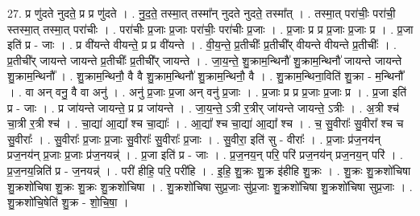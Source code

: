 \documentclass[17pt]{extarticle}
\begin{document}
27. प्र णु॑दते नुदते॒ प्र प्र णु॑दते । . नु॒द॒ते॒ तस्मा॒त् तस्मा᳚न् नुदते नुदते॒ तस्मा᳚त् । . तस्मा॒त् परा॑चीः॒ परा॑ची॒ स्तस्मा॒त् तस्मा॒त् परा॑चीः । . परा॑चीः प्र॒जाः प्र॒जाः परा॑चीः॒ परा॑चीः प्र॒जाः । . प्र॒जाः प्र प्र प्र॒जाः प्र॒जाः प्र । . प्र॒जा इति॑ प्र - जाः । . प्र वी॑यन्ते वीयन्ते॒ प्र प्र वी॑यन्ते । . वी॒य॒न्ते॒ प्र॒तीचीः᳚ प्र॒तीची᳚र् वीयन्ते वीयन्ते प्र॒तीचीः᳚ । . प्र॒तीची᳚र् जायन्ते जायन्ते प्र॒तीचीः᳚ प्र॒तीची᳚र् जायन्ते । . जा॒य॒न्ते॒ शु॒क्राम॒न्थिनौ॑ शु॒क्राम॒न्थिनौ॑ जायन्ते जायन्ते शु॒क्राम॒न्थिनौ᳚ । . शु॒क्राम॒न्थिनौ॒ वै वै शु॒क्राम॒न्थिनौ॑ शु॒क्राम॒न्थिनौ॒ वै । . शु॒क्राम॒न्थिना॒विति॑ शु॒क्रा - म॒न्थिनौ᳚ । . वा अन् वनु॒ वै वा अनु॑ । . अनु॑ प्र॒जाः प्र॒जा अन् वनु॑ प्र॒जाः । . प्र॒जाः प्र प्र प्र॒जाः प्र॒जाः प्र । . प्र॒जा इति॑ प्र - जाः । . प्र जा॑यन्ते जायन्ते॒ प्र प्र जा॑यन्ते । . जा॒य॒न्ते॒ ऽत्री र॒त्रीर् जा॑यन्ते जायन्ते॒ ऽत्रीः । . अ॒त्री श्च॑ चा॒त्री र॒त्री श्च॑ । . चा॒द्या॑ आ॒द्या᳚ श्च चा॒द्याः᳚ । . आ॒द्या᳚ श्च चा॒द्या॑ आ॒द्या᳚ श्च । . च॒ सु॒वीराः᳚ सु॒वीरा᳚ श्च च सु॒वीराः᳚ । . सु॒वीराः᳚ प्र॒जाः प्र॒जाः सु॒वीराः᳚ सु॒वीराः᳚ प्र॒जाः । . सु॒वीरा॒ इति॑ सु - वीराः᳚ । . प्र॒जाः प्र॑ज॒नय॑न् प्रज॒नय॑न् प्र॒जाः प्र॒जाः प्र॑ज॒नयन्न्॑ । . प्र॒जा इति॑ प्र - जाः । . प्र॒ज॒नय॒न् परि॒ परि॑ प्रज॒नय॑न् प्रज॒नय॒न् परि॑ । . प्र॒ज॒नय॒न्निति॑ प्र - ज॒नयन्न्॑ । . परी॑ हीहि॒ परि॒ परी॑हि । . इ॒हि॒ शु॒क्रः शु॒क्र इ॑हीहि शु॒क्रः । . शु॒क्रः शु॒क्रशो॑चिषा शु॒क्रशो॑चिषा शु॒क्रः शु॒क्रः शु॒क्रशो॑चिषा । . शु॒क्रशो॑चिषा सुप्र॒जाः सु॑प्र॒जाः शु॒क्रशो॑चिषा शु॒क्रशो॑चिषा सुप्र॒जाः । . शु॒क्रशो॑चि॒षेति॑ शु॒क्र - शो॒चि॒षा॒ । \newline
\end{document}
